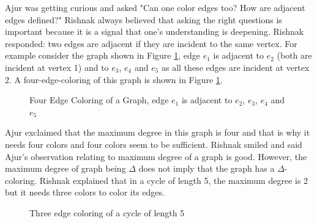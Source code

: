 Ajur was getting curious and asked "Can one color edges too? How are adjacent edges defined?"  Rishnak always believed that asking the right questions is important because it is a signal that one's understanding is deepening. Rishnak responded: two edges are adjacent if they are incident to the same vertex. For example consider the graph shown in Figure \ref{10g5},
edge $e_1$ is adjacent to $e_2$ (both are incident at vertex 1) and to $e_3$, $e_4$ and $e_5$ as all these edges are incident at vertex 2. A 
four-edge-coloring of this graph is shown in Figure \ref{10g5}. 

\begin{figure}
\begin{center}


\caption{Four Edge Coloring of a Graph, edge $e_1$ is adjacent to $e_2$, $e_3$,
$e_4$ and $e_5$}\label{10g5}
\end{center}
\end{figure}

Ajur exclaimed that the maximum degree in this graph is four and that is why it needs four colors and four colors seem to be sufficient. Rishnak smiled and said Ajur's observation relating to maximum degree of a graph is good. However, the maximum degree of graph being $\Delta$ does not imply that the graph has a $\Delta$-coloring. Rishnak explained that in a cycle of length 5, the maximum degree is 2 but it needs three colors to color its edges.

\begin{figure}
\begin{center}


\caption{Three edge coloring of a cycle of length 5 }\label{10g6}
\end{center}
\end{figure}

